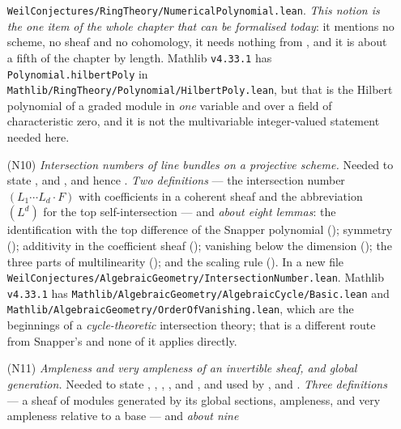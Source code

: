 \begin{enumerate}
  \texttt{WeilConjectures/RingTheory/NumericalPolynomial.lean}.
  \emph{This notion is the one item of the whole chapter that can be
  formalised today}: it mentions no scheme, no sheaf and no cohomology, it
  needs nothing from , and it is about a fifth of the
  chapter by length.  Mathlib \texttt{v4.33.1} has
  \texttt{Polynomial.hilbertPoly} in
  \texttt{Mathlib/RingTheory/Polynomial/HilbertPoly.lean}, but that is the
  Hilbert polynomial of a graded module in \emph{one} variable and over a
  field of characteristic zero, and it is not the multivariable
  integer-valued statement needed here.
  \item[(N10)] \emph{Intersection numbers of line bundles on a projective
  scheme.}  Needed to state ,
   and , and
  hence .  \emph{Two definitions} --- the
  intersection number $(L_1\cdots L_d\cdot F)$ with coefficients in a coherent
  sheaf and the abbreviation $(L^d)$ for the top self-intersection --- and
  \emph{about eight lemmas}: the identification with the top difference of the
  Snapper polynomial (); symmetry
  (); additivity in the coefficient sheaf
  (); vanishing below the dimension
  (); the three parts of
  multilinearity (); and the scaling
  rule ().  In a new file
  \texttt{WeilConjectures/AlgebraicGeometry/IntersectionNumber.lean}.
  Mathlib \texttt{v4.33.1} has
  \texttt{Mathlib/AlgebraicGeometry/AlgebraicCycle/Basic.lean} and
  \texttt{Mathlib/AlgebraicGeometry/OrderOfVanishing.lean}, which are the
  beginnings of a \emph{cycle-theoretic} intersection theory; that is a
  different route from Snapper's and none of it applies directly.
  \item[(N11)] \emph{Ampleness and very ampleness of an invertible sheaf, and
  global generation.}  Needed to state ,
  , ,
  ,  and
  , and used by ,
   and .  \emph{Three
  definitions} --- a sheaf of modules generated by its global sections,
  ampleness, and very ampleness relative to a base --- and \emph{about nine
}
\end{enumerate}
